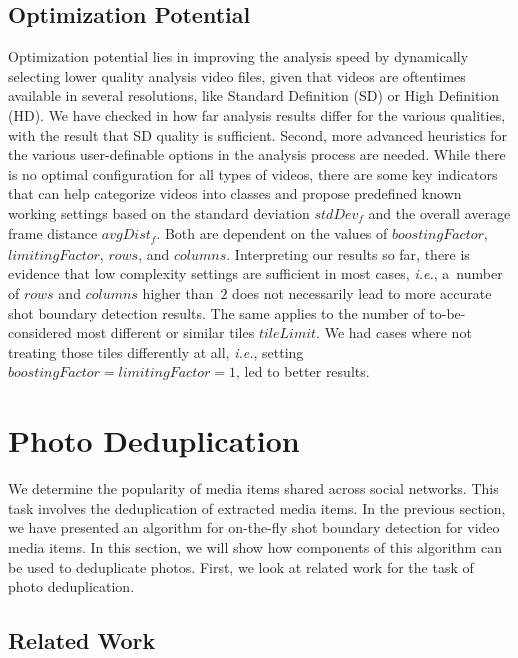 \subsection{Optimization Potential}

Optimization potential lies in
improving the analysis speed by dynamically selecting
lower quality analysis video files,
given that videos are oftentimes available in several resolutions,
like Standard Definition (SD) or High Definition (HD).
We have checked in how far analysis results differ
for the various qualities,
with the result that SD quality is sufficient.
Second, more advanced heuristics for the various user-definable
options in the analysis process are needed.
While there is no optimal configuration for all types of videos,
there are some key indicators that can help categorize videos
into classes and propose predefined known working settings
based on the standard deviation $\mathit{stdDev_{f}}$
and the overall average frame distance $\mathit{avgDist_{f}}$.
Both are dependent on the values of $\mathit{boostingFactor}$,
$\mathit{limitingFactor}$, $\mathit{rows}$, and $\mathit{columns}$. 
Interpreting our results so far, there is evidence
that low complexity settings are sufficient in most cases,
\emph{i.e.}, a~number of $\mathit{rows}$ and $\mathit{columns}$
higher than~$\mathit{2}$ does not necessarily
lead to more accurate shot boundary detection results.
The same applies to the number of to-be-considered most different
or similar tiles $\mathit{tileLimit}$.
We had cases where not treating those tiles differently
at all, \emph{i.e.}, setting
$\mathit{boostingFactor} = \mathit{limitingFactor} = \mathit{1}$, 
led to better results.

\section{Photo Deduplication}

We determine the popularity of media items
shared across social networks.
This task involves the deduplication of extracted media items.
In the previous section, we have presented an algorithm
for on-the-fly shot boundary detection for video media items.
In this section, we will show how components of this algorithm
can be used to deduplicate photos.
First, we look at related work for the task of photo deduplication.

\subsection{Related Work}

